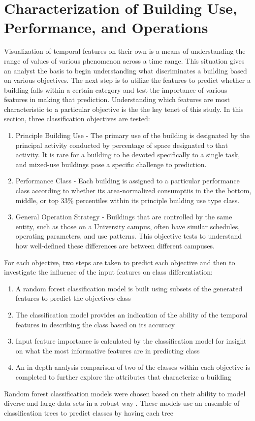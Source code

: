 \section{Characterization of Building Use, Performance, and Operations}
\label{sec:characterization}

Visualization of temporal features on their own is a means of understanding the range of values of various phenomenon across a time range. This situation gives an analyst the basis to begin understanding what discriminates a building based on various objectives. The next step is to utilize the features to predict whether a building falls within a certain category and test the importance of various features in making that prediction. Understanding which features are most characteristic to a particular objective is the the key tenet of this study. In this section, three classification objectives are tested: 

\begin{enumerate}
\item Principle Building Use - The primary use of the building is designated by the principal activity conducted by percentage of space designated to that activity. It is rare for a building to be devoted specifically to a single task, and mixed-use buildings pose a specific challenge to prediction.
\item Performance Class - Each building is assigned to a particular performance class according to whether its area-normalized consumptiis in the the bottom, middle, or top 33\% percentiles within its principle building use type class.
\item General Operation Strategy - Buildings that are controlled by the same entity, such as those on a University campus, often have similar schedules, operating parameters, and use patterns. This objective tests to understand how well-defined these differences are between different campuses.
\end{enumerate}

For each objective, two steps are taken to predict each objective and then to investigate the influence of the input features on class differentiation:
\begin{enumerate}
\item A random forest classification model is built using subsets of the generated features to predict the objectives class
\item The classification model provides an indication of the ability of the temporal features in describing the class based on its accuracy
\item Input feature importance is calculated by the classification model for insight on what the most informative features are in predicting class
\item An in-depth analysis comparison of two of the classes within each objective is completed to further explore the attributes that characterize a building
\end{enumerate}

Random forest classification models were chosen based on their ability to model diverse and large data sets in a robust way \cite{Breiman}. These models use an ensemble of classification trees to predict classes by having each tree 
